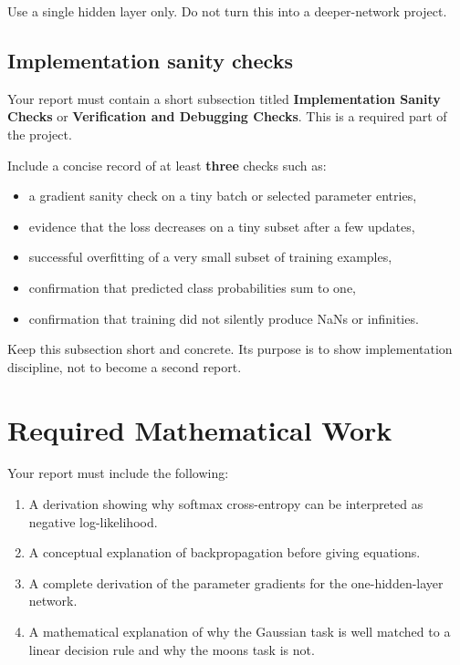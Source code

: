 \documentclass[11pt]{article}
\begin{document}
Use a single hidden layer only. Do not turn this into a deeper-network project.

\subsection{Implementation sanity checks}

Your report must contain a short subsection titled \textbf{Implementation Sanity Checks} or \textbf{Verification and Debugging Checks}. This is a required part of the project.

Include a concise record of at least \textbf{three} checks such as:

\begin{itemize}
    \item a gradient sanity check on a tiny batch or selected parameter entries,
    \item evidence that the loss decreases on a tiny subset after a few updates,
    \item successful overfitting of a very small subset of training examples,
    \item confirmation that predicted class probabilities sum to one,
    \item confirmation that training did not silently produce NaNs or infinities.
\end{itemize}

Keep this subsection short and concrete. Its purpose is to show implementation discipline, not to become a second report.

\section{Required Mathematical Work}

Your report must include the following:

\begin{enumerate}
    \item A derivation showing why softmax cross-entropy can be interpreted as negative log-likelihood.
    \item A conceptual explanation of backpropagation before giving equations.
    \item A complete derivation of the parameter gradients for the one-hidden-layer network.
    \item A mathematical explanation of why the Gaussian task is well matched to a linear decision rule and why the moons task is not.
\end{enumerate}
\end{document}
